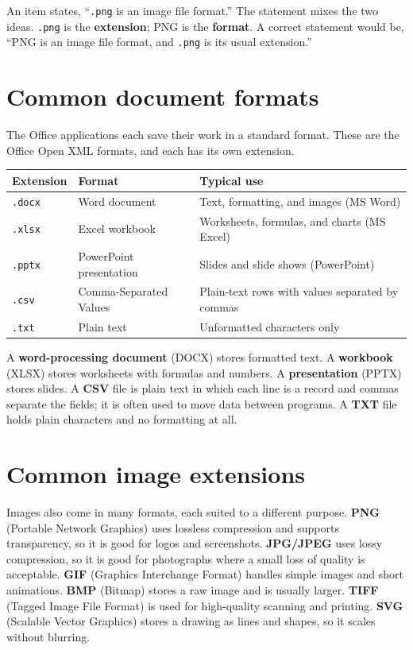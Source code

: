 \begin{example}
An item states, ``\texttt{.png} is an image file format.'' The statement
mixes the two ideas. \texttt{.png} is the \textbf{extension}; PNG is the
\textbf{format}. A correct statement would be, ``PNG is an image file format,
and \texttt{.png} is its usual extension.''
\end{example}

\section{Common document formats}
The Office applications each save their work in a standard format. These are
the Office Open XML formats, and each has its own extension.

\begin{center}
\begin{tabular}{p{}p{}p{}}
\toprule
\textbf{Extension} & \textbf{Format} & \textbf{Typical use} \\
\midrule
\texttt{.docx} & Word document & Text, formatting, and images (MS Word) \\
\texttt{.xlsx} & Excel workbook & Worksheets, formulas, and charts (MS Excel) \\
\texttt{.pptx} & PowerPoint presentation & Slides and slide shows (PowerPoint) \\
\texttt{.csv} & Comma-Separated Values & Plain-text rows with values separated by commas \\
\texttt{.txt} & Plain text & Unformatted characters only \\
\bottomrule
\end{tabular}
\end{center}

A \textbf{word-processing document} (DOCX) stores formatted text. A
\textbf{workbook} (XLSX) stores worksheets with formulas and numbers. A
\textbf{presentation} (PPTX) stores slides. A \textbf{CSV} file is plain text
in which each line is a record and commas separate the fields; it is often
used to move data between programs. A \textbf{TXT} file holds plain
characters and no formatting at all.

\section{Common image extensions}
Images also come in many formats, each suited to a different purpose.
\textbf{PNG} (Portable Network Graphics) uses lossless compression and
supports transparency, so it is good for logos and screenshots.
\textbf{JPG/JPEG} uses lossy compression, so it is good for photographs where
a small loss of quality is acceptable. \textbf{GIF} (Graphics Interchange
Format) handles simple images and short animations. \textbf{BMP} (Bitmap)
stores a raw image and is usually larger. \textbf{TIFF} (Tagged Image File
Format) is used for high-quality scanning and printing. \textbf{SVG}
(Scalable Vector Graphics) stores a drawing as lines and shapes, so it scales
without blurring.

